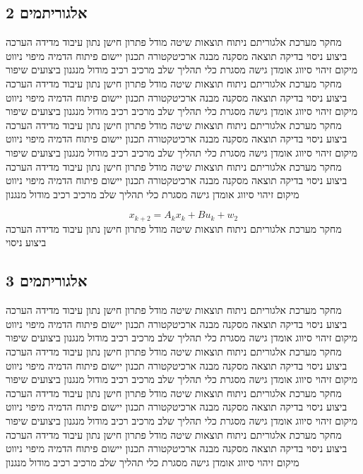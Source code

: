 \subsection{אלגוריתמים 2}
\label{sub:ch04_2}
מחקר מערכת אלגוריתם ניתוח תוצאות שיטה מודל פתרון חישן נתון עיבוד מדידה הערכה ביצוע ניסוי בדיקה תוצאה מסקנה מבנה ארכיטקטורה תכנון יישום פיתוח הדמיה מיפוי ניווט מיקום זיהוי סיווג אומדן גישה מסגרת כלי תהליך שלב מרכיב רכיב מודול מנגנון ביצועים שיפור מחקר מערכת אלגוריתם ניתוח תוצאות שיטה מודל פתרון חישן נתון עיבוד מדידה הערכה ביצוע ניסוי בדיקה תוצאה מסקנה מבנה ארכיטקטורה תכנון יישום פיתוח הדמיה מיפוי ניווט מיקום זיהוי סיווג אומדן גישה מסגרת כלי תהליך שלב מרכיב רכיב מודול מנגנון ביצועים שיפור מחקר מערכת אלגוריתם ניתוח תוצאות שיטה מודל פתרון חישן נתון עיבוד מדידה הערכה ביצוע ניסוי בדיקה תוצאה מסקנה מבנה ארכיטקטורה תכנון יישום פיתוח הדמיה מיפוי ניווט מיקום זיהוי סיווג אומדן גישה מסגרת כלי תהליך שלב מרכיב רכיב מודול מנגנון ביצועים שיפור מחקר מערכת אלגוריתם ניתוח תוצאות שיטה מודל פתרון חישן נתון עיבוד מדידה הערכה ביצוע ניסוי בדיקה תוצאה מסקנה מבנה ארכיטקטורה תכנון יישום פיתוח הדמיה מיפוי ניווט מיקום זיהוי סיווג אומדן גישה מסגרת כלי תהליך שלב מרכיב רכיב מודול מנגנון

\begin{equation}
    x_{k+2} = A_{k} x_k + B u_{k} + w_{2}
    \label{eq:ch04_2}
\end{equation}
מחקר מערכת אלגוריתם ניתוח תוצאות שיטה מודל פתרון חישן נתון עיבוד מדידה הערכה ביצוע ניסוי

\subsection{אלגוריתמים 3}
\label{sub:ch04_3}
מחקר מערכת אלגוריתם ניתוח תוצאות שיטה מודל פתרון חישן נתון עיבוד מדידה הערכה ביצוע ניסוי בדיקה תוצאה מסקנה מבנה ארכיטקטורה תכנון יישום פיתוח הדמיה מיפוי ניווט מיקום זיהוי סיווג אומדן גישה מסגרת כלי תהליך שלב מרכיב רכיב מודול מנגנון ביצועים שיפור מחקר מערכת אלגוריתם ניתוח תוצאות שיטה מודל פתרון חישן נתון עיבוד מדידה הערכה ביצוע ניסוי בדיקה תוצאה מסקנה מבנה ארכיטקטורה תכנון יישום פיתוח הדמיה מיפוי ניווט מיקום זיהוי סיווג אומדן גישה מסגרת כלי תהליך שלב מרכיב רכיב מודול מנגנון ביצועים שיפור מחקר מערכת אלגוריתם ניתוח תוצאות שיטה מודל פתרון חישן נתון עיבוד מדידה הערכה ביצוע ניסוי בדיקה תוצאה מסקנה מבנה ארכיטקטורה תכנון יישום פיתוח הדמיה מיפוי ניווט מיקום זיהוי סיווג אומדן גישה מסגרת כלי תהליך שלב מרכיב רכיב מודול מנגנון ביצועים שיפור מחקר מערכת אלגוריתם ניתוח תוצאות שיטה מודל פתרון חישן נתון עיבוד מדידה הערכה ביצוע ניסוי בדיקה תוצאה מסקנה מבנה ארכיטקטורה תכנון יישום פיתוח הדמיה מיפוי ניווט מיקום זיהוי סיווג אומדן גישה מסגרת כלי תהליך שלב מרכיב רכיב מודול מנגנון

